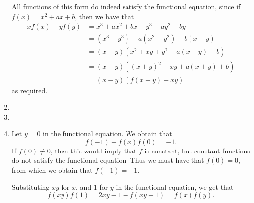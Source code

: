 \documentclass[12pt]{article}
\begin{document}
\begin{enumerate}
All functions of this form do indeed satisfy the functional equation, since if
$f(x) = x^2 + ax + b$, then we have that
\begin{align*}
    xf(x) - yf(y) & = x^3 + ax^2 + bx - y^3 - ay^2 - by \\
    & = (x^3 - y^3) + a(x^2 - y^2) + b(x - y) \\
    & = (x - y)(x^2 + xy + y^2 + a(x + y) + b) \\
    & = (x - y)((x + y)^2 - xy + a(x + y) + b) \\
    & = (x - y)(f(x + y) - xy)
\end{align*}
as required.


\item %


\item %
%


\item %

Let $y = 0$ in the functional equation. We obtain that
\[
    f(-1) + f(x) f(0) = -1.
\]
If $f(0) \neq 0$, then this would imply that $f$ is constant, but constant
functions do not satisfy the functional equation. Thus we must have that $f(0) =
0$, from which we obtain that $f(-1) = -1$.

Substituting $xy$ for $x$, and $1$ for $y$ in the functional equation, we get
that
\begin{equation} \label{eq:q6_multiplicative}
    f(xy) f(1) = 2xy - 1 - f(xy - 1) = f(x) f(y).
\end{equation}


\end{enumerate}
\end{document}
